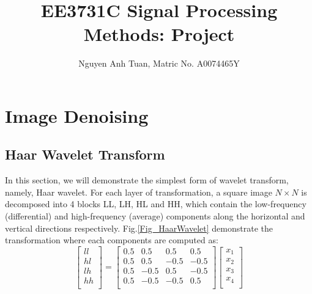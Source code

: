 \documentclass[11pt]{article}
\begin{document}
\title{\Huge EE3731C Signal Processing Methods: Project}
\author{Nguyen Anh Tuan, Matric No. A0074465Y}
\maketitle

\section{Image Denoising}

\subsection{Haar Wavelet Transform}
In this section, we will demonstrate the simplest form of wavelet transform, namely, Haar wavelet. For each layer of transformation, a square image $N \times N$ is decomposed into 4 blocks LL, LH, HL and HH, which contain the low-frequency (differential) and high-frequency (average) components along the horizontal and vertical directions respectively. Fig.\ref{Fig_HaarWavelet} demonstrate the transformation where each components are computed as:
$$
\left[{\begin{array}{c}
    ll\\
	hl\\
	lh\\
	hh\\
\end{array}}\right] =  
\left[{\begin{array}{cccc}
	0.5 & 0.5 & 0.5 & 0.5\\
	0.5 & 0.5 & -0.5 & -0.5\\
	0.5 & -0.5 & 0.5 & -0.5\\	
	0.5 & -0.5 & -0.5 & 0.5\\
\end{array}}\right]
\left[{\begin{array}{c}
	x_1\\
	x_2\\
	x_3\\
	x_4\\
\end{array}}\right]
$$
\end{document}
